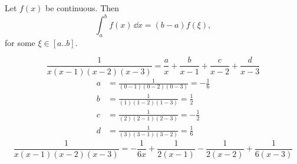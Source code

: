 \begin{QuizSolution}
  \label{quiz solution integral mean value theorem}
  Let $f(x)$ be continuous.  Then
  \[
  \int_a^b f(x) \,\dd x = (b-a) f(\xi),
  \]
  for some $\xi \in [a .. b]$.
\end{QuizSolution}


\begin{QuizSolution}
  \label{quiz solution partial fraction 1xx-1x-2x-3}
  \[
  \frac{1}{x(x-1)(x-2)(x-3)} = \frac{a}{x} + \frac{b}{x-1} + \frac{c}{x-2}
  + \frac{d}{x-3}
  \]
  \begin{align*}
    a &= \frac{1}{(0-1)(0-2)(0-3)} = - \frac{1}{6} 
    \\
    b &= \frac{1}{(1)(1-2)(1-3)} = \frac{1}{2} 
    \\
    c &= \frac{1}{(2)(2-1)(2-3)} = - \frac{1}{2} 
    \\
    d &= \frac{1}{(3)(3-1)(3-2)} = \frac{1}{6}
  \end{align*}
  \[
  \frac{1}{x(x-1)(x-2)(x-3)} = - \frac{1}{6 x} + \frac{1}{2(x-1)} 
  - \frac{1}{2(x-2)} + \frac{1}{6(x-3)}
  \]
\end{QuizSolution}







\raggedbottom

